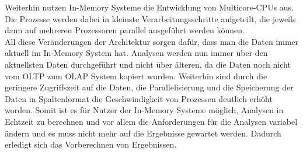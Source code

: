 Weiterhin nutzen In-Memory Systeme die Entwicklung von Multicore-CPUs aus. Die Prozesse werden dabei in kleinste Verarbeitungsschritte aufgeteilt, die jeweils dann auf mehreren Prozessoren parallel ausgeführt werden können.\\
All diese Veränderungen der Architektur sorgen dafür, dass man die Daten immer 
aktuell im In-Memory System hat. Analysen werden nun immer über 
den aktuellsten Daten durchgeführt und nicht über älteren, da die Daten noch nicht vom OLTP zum OLAP System kopiert wurden. Weiterhin sind durch die geringere Zugriffszeit auf die Daten, die Parallelisierung und die Speicherung der Daten in Spaltenformat die Geschwindigkeit von Prozessen deutlich erhöht worden. Somit ist es für Nutzer der In-Memory Systeme möglich, Analysen in Echtzeit zu berechnen und vor allem die Anforderungen für die Analysen variabel ändern und es muss nicht mehr auf die Ergebnisse gewartet werden. Dadurch erledigt sich das Vorberechnen von Ergebnissen.
\\
